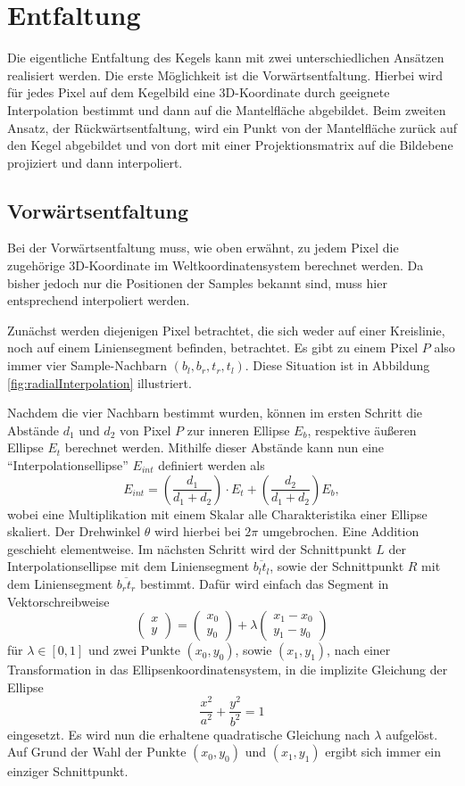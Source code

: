 \section{Entfaltung}
\label{s:unfolding}
Die eigentliche Entfaltung des Kegels kann mit zwei unterschiedlichen Ansätzen realisiert werden.
Die erste Möglichkeit ist die Vorwärtsentfaltung. Hierbei wird für jedes Pixel auf dem Kegelbild eine 3D-Koordinate durch geeignete Interpolation bestimmt und dann auf die Mantelfläche abgebildet. Beim zweiten Ansatz, der Rückwärtsentfaltung, wird ein Punkt von der Mantelfläche zurück auf den Kegel abgebildet und von dort mit einer Projektionsmatrix auf die Bildebene projiziert und dann interpoliert.

\subsection{Vorwärtsentfaltung}
Bei der Vorwärtsentfaltung muss, wie oben erwähnt, zu jedem Pixel die zugehörige 3D-Koordinate im Weltkoordinatensystem berechnet werden. Da bisher jedoch nur die Positionen der Samples bekannt sind, muss hier entsprechend interpoliert werden.

Zunächst werden diejenigen Pixel betrachtet, die sich weder auf einer Kreislinie, noch auf einem Liniensegment befinden, betrachtet. Es gibt zu einem Pixel $P$ also immer vier Sample-Nachbarn $(b_l, b_r, t_r, t_l)$. Diese Situation ist in Abbildung \ref{fig:radialInterpolation} illustriert.

Nachdem die vier Nachbarn bestimmt wurden, können im ersten Schritt die Abstände $d_1$ und $d_2$ von Pixel $P$ zur inneren Ellipse $E_b$, respektive äußeren Ellipse $E_t$ berechnet werden. Mithilfe dieser Abstände kann nun eine "`Interpolationsellipse"' $E_{int}$ definiert werden als
\[
	E_{int} = \left(\frac{d_1}{d_1 + d_2}\right) \cdot E_t + \left(\frac{d_2}{d_1 + d_2}\right) E_b,
\]
wobei eine Multiplikation mit einem Skalar alle Charakteristika einer Ellipse skaliert. Der Drehwinkel $\theta$ wird hierbei bei $2\pi$ umgebrochen. Eine Addition geschieht elementweise. Im nächsten Schritt wird der Schnittpunkt $L$ der Interpolationsellipse mit dem Liniensegment $\overline{b_lt_l}$, sowie der Schnittpunkt $R$ mit dem Liniensegment $\overline{b_rt_r}$ bestimmt. Dafür wird einfach das Segment in Vektorschreibweise
\[
\begin{pmatrix}
x \\ y
\end{pmatrix} = 
\begin{pmatrix}
x_0 \\ y_0
\end{pmatrix} + \lambda \begin{pmatrix}
x_1 - x_0 \\ y_1 - y_0
\end{pmatrix}
\] %
für $\lambda \in [0,1]$ und zwei Punkte $(x_0,y_0)$, sowie $(x_1,y_1)$, nach einer Transformation in das Ellipsenkoordinatensystem, in die implizite Gleichung der Ellipse
\[
\frac{x^2}{a^2} + \frac{y^2}{b^2} = 1
\] %
eingesetzt.
Es wird nun die erhaltene quadratische Gleichung nach $\lambda$ aufgelöst. Auf Grund der Wahl der Punkte $(x_0,y_0)$ und $(x_1,y_1)$ ergibt sich immer ein einziger Schnittpunkt.

